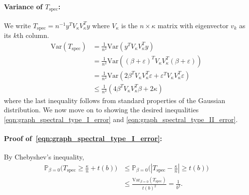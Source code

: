 \documentclass{article}
\newcommand{\abs}[1]{\left \lvert #1 \right \rvert}
\newcommand{\Var}{\mathrm{Var}}
\newcommand{\1}{\mathbf{1}}
\newcommand{\Pbb}{\mathbb{P}}
\newcommand{\spec}{\mathrm{spec}}
\theoremstyle{alden}
\theoremstyle{aldenthm}
\theoremstyle{definition}
\theoremstyle{remark}
\begin{document}
\paragraph{Variance of $T_{\mathrm{spec}}$:}
We write $T_{\mathrm{spec}} = n^{-1} y^T V_{\kappa} V_{\kappa}^T y$ where $V_{\kappa}$ is the $n \times \kappa$ matrix with eigenvector $v_k$ as its $k$th column.
\begin{align*}
\Var(T_{\spec}) & = \frac{1}{n^2} \Var(y^T V_{\kappa} V_{\kappa}^T y) \\
& = \frac{1}{n^2} \Var((\beta + \varepsilon)^T V_{\kappa} V_{\kappa}^T (\beta + \varepsilon)) \\
& = \frac{1}{n^2} \Var(2 \beta^T V_{\kappa} V_{\kappa}^T \varepsilon + \varepsilon^T V_{\kappa} V_{\kappa}^T \varepsilon) \\
& \leq \frac{1}{n^2}(4 \beta^T V_{\kappa} V_{\kappa}^T \beta + 2\kappa)
\end{align*}
where the last inequality follows from standard properties of the Gaussian distribution. We now move on to showing the desired inequalities \eqref{eqn:graph_spectral_type_I_error} and \eqref{eqn:graph_spectral_type_II_error}.

\paragraph{Proof of~\eqref{eqn:graph_spectral_type_I_error}:} By Chebyshev's inequality,
\begin{align*}
\Pbb_{\beta = 0}\bigl(T_{\spec} \geq \frac{\kappa}{n} + t(b)\bigr)
& \leq \Pbb_{\beta = 0}\bigl(\abs{T_{\spec} - \frac{\kappa}{n}} \geq t(b)\bigr) \\
& \leq \frac{\Var_{\beta = 0}(T_{\spec})}{t(b)^2} = \frac{1}{b^2}.
\end{align*}
\end{document}
